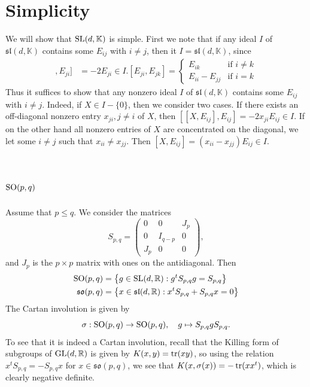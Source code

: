 \documentclass{report}
\begin{document}
\section{Simplicity}
We will show that $\operatorname{{\mathrm{SL}}}(d, \mathbb K)$ is simple.
First we note that if any ideal $I$ of $\mathfrak{sl}(d, \mathbb K)$ contains some $E_{ij}$ with $i \neq j$, then it $I = \mathfrak{sl}(d, \mathbb K)$, since
\begin{align*}
    [[E_{ij}, E_{ji}], E_{ji}] &= -2 E_{ji} \in I.
    [E_{ji}, E_{jk}] = \begin{cases}
        E_{ik} & \text{if } i \neq k\\
        E_{ii} - E_{jj} & \text{if } i = k
    \end{cases}
\end{align*}
Thus it suffices to show that any nonzero ideal $I$ of $\mathfrak{sl}(d, \mathbb K)$ contains some $E_{ij}$ with $i \neq j$.
Indeed, if $X \in I - \{0 \}$, then we consider two cases.
If there exists an off-diagonal nonzero entry $x_{ji}, j\neq i$ of $X$, then $[[X, E_{ij}], E_{ij}] = -2x_{ji}E_{ij} \in I$.
If on the other hand all nonzero entries of $X$ are concentrated on the diagonal, we let some $i \neq j$ such that $x_{ii} \neq x_{jj}$.
Then $[X, E_{ij}] = (x_{ii} - x_{jj})E_{ij} \in I$. 

\section{$\operatorname{{\mathrm{SO}}}(p,q)$}
Assume that $p \leq q$.
We consider the matrices
\[
S_{p,q} = \begin{pmatrix} 
    0 & 0 & J_p \\ 
    0 & I_{q-p} & 0\\
    J_p & 0 & 0
\end{pmatrix},
\]
and $J_p$ is the $p \times p$ matrix with ones on the antidiagonal.
Then
\begin{align*}
    \operatorname{{\mathrm{SO}}}(p,q) &= \left\{ g \in \operatorname{{\mathrm{SL}}}(d, \mathbb R) : g^t S_{p,q} g = S_{p,q} \right\}\\
    \mathfrak{so}(p,q) &= \left\{ x \in \mathfrak{sl}(d, \mathbb R) : x^t S_{p,q} + S_{p,q}x = 0 \right\}
\end{align*}
The Cartan involution is given by 
\[
\sigma: \operatorname{{\mathrm{SO}}}(p,q) \to \operatorname{{\mathrm{SO}}}(p,q), \quad g \mapsto S_{p,q} g S_{p,q}.
\]
To see that it is indeed a Cartan involution, recall that the Killing form of subgroups of $\operatorname{{\mathrm{GL}}}(d, \mathbb R)$ is given by $K(x,y) = \operatorname{tr}(xy)$, so using the relation $x^t S_{p,q} = - S_{p,q}x$ for $x \in \mathfrak{so}(p,q)$, we see that $K(x, \sigma(x)) = - \operatorname{tr}(x x^t)$, which is clearly negative definite.
\end{document}
